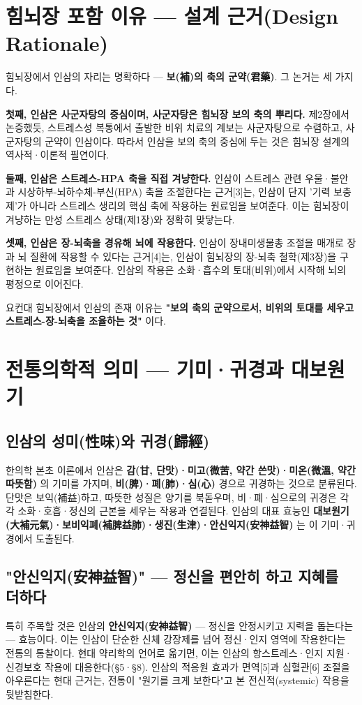 \documentclass[11pt,oneside]{book}
\begin{document}
\section{힘뇌장 포함 이유 — 설계 근거(Design Rationale)}
힘뇌장에서 인삼의 자리는 명확하다 — \textbf{보(補)의 축의 군약(君藥)}. 그 논거는 세 가지다.

\textbf{첫째, 인삼은 사군자탕의 중심이며, 사군자탕은 힘뇌장 보의 축의 뿌리다.} 제2장에서 논증했듯, 스트레스성 복통에서 출발한 비위 치료의 계보는 사군자탕으로 수렴하고, 사군자탕의 군약이 인삼이다. 따라서 인삼을 보의 축의 중심에 두는 것은 힘뇌장 설계의 역사적·이론적 필연이다.

\textbf{둘째, 인삼은 스트레스-HPA 축을 직접 겨냥한다.} 인삼이 스트레스 관련 우울·불안과 시상하부-뇌하수체-부신(HPA) 축을 조절한다는 근거[3]는, 인삼이 단지 '기력 보충제'가 아니라 스트레스 생리의 핵심 축에 작용하는 원료임을 보여준다. 이는 힘뇌장이 겨냥하는 만성 스트레스 상태(제1장)와 정확히 맞닿는다.

\textbf{셋째, 인삼은 장-뇌축을 경유해 뇌에 작용한다.} 인삼이 장내미생물총 조절을 매개로 장과 뇌 질환에 작용할 수 있다는 근거[4]는, 인삼이 힘뇌장의 장-뇌축 철학(제3장)을 구현하는 원료임을 보여준다. 인삼의 작용은 소화·흡수의 토대(비위)에서 시작해 뇌의 평정으로 이어진다.

요컨대 힘뇌장에서 인삼의 존재 이유는 \textbf{"보의 축의 군약으로서, 비위의 토대를 세우고 스트레스-장-뇌축을 조율하는 것"} 이다.

\section{전통의학적 의미 — 기미·귀경과 대보원기}
\subsection{인삼의 성미(性味)와 귀경(歸經)}
한의학 본초 이론에서 인삼은 \textbf{감(甘, 단맛)·미고(微苦, 약간 쓴맛)·미온(微溫, 약간 따뜻함)} 의 기미를 가지며, \textbf{비(脾)·폐(肺)·심(心)} 경으로 귀경하는 것으로 분류된다. 단맛은 보익(補益)하고, 따뜻한 성질은 양기를 북돋우며, 비·폐·심으로의 귀경은 각각 소화·호흡·정신의 근본을 세우는 작용과 연결된다. 인삼의 대표 효능인 \textbf{대보원기(大補元氣)·보비익폐(補脾益肺)·생진(生津)·안신익지(安神益智)} 는 이 기미·귀경에서 도출된다.

\subsection{"안신익지(安神益智)" — 정신을 편안히 하고 지혜를 더하다}
특히 주목할 것은 인삼의 \textbf{안신익지(安神益智)} — 정신을 안정시키고 지력을 돕는다는 — 효능이다. 이는 인삼이 단순한 신체 강장제를 넘어 정신·인지 영역에 작용한다는 전통의 통찰이다. 현대 약리학의 언어로 옮기면, 이는 인삼의 항스트레스·인지 지원·신경보호 작용에 대응한다(§5·§8). 인삼의 적응원 효과가 면역[5]과 심혈관[6] 조절을 아우른다는 현대 근거는, 전통이 "원기를 크게 보한다"고 본 전신적(systemic) 작용을 뒷받침한다.
\end{document}

